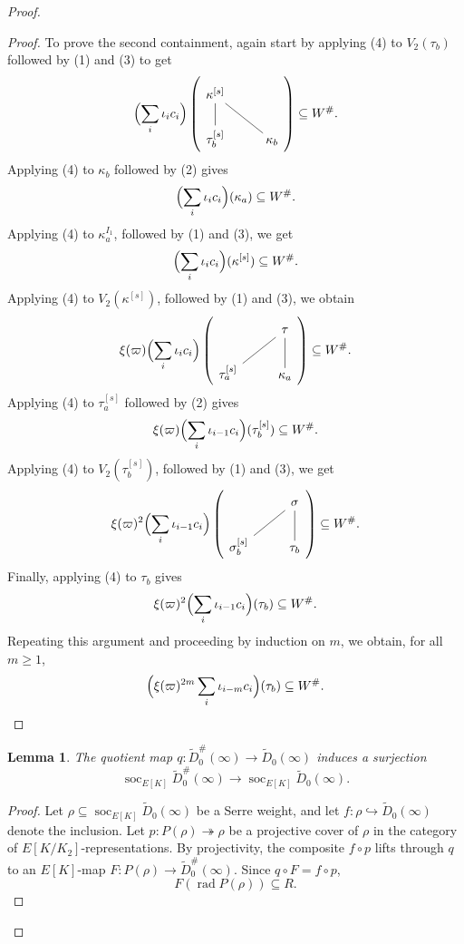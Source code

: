 \documentclass[a4paper,10pt,twoside]{amsart}
\newtheorem{lemma}[theorem]{Lemma}
\theoremstyle{definition}
\numberwithin{equation}{section}
\begin{document}
\begin{proof}
\begin{proof}
To prove the second containment, again start by applying (4) to $V_2(\tau_b)$ followed by (1) and (3) to get
\[
\Bigl( \sum_i \iota_i c_i \Bigr)
\left(
\begin{tikzcd}
\kappa^{[s]} & \\
\tau_b^{[s]} & \kappa_b
\arrow[no head, from=1-1, to=2-1]
\arrow[no head, from=1-1, to=2-2]
\end{tikzcd}
\right)
\subseteq W^\#.
\]
Applying (4) to $\kappa_b$ followed by (2) gives
\[
\Bigl( \sum_i \iota_i c_i \Bigr)(\kappa_a) \subseteq W^\#.
\]
Applying (4) to $\kappa_a^{I_1}$, followed by (1) and (3), we get
\[
\Bigl( \sum_i \iota_i c_i \Bigr)(\kappa^{[s]}) \subseteq W^\#.
\]
Applying (4) to $V_2(\kappa^{[s]})$, followed by (1) and (3), we obtain
\[
\xi(\varpi) \Bigl( \sum_i \iota_i c_i \Bigr)
\left(
\begin{tikzcd}
& \tau \\
\tau_a^{[s]} & \kappa_a
\arrow[no head, from=1-2, to=2-1]
\arrow[no head, from=1-2, to=2-2]
\end{tikzcd}
\right)
\subseteq W^\#.
\]
Applying (4) to $\tau_a^{[s]}$ followed by (2) gives
\[
\xi(\varpi) \Bigl( \sum_i \iota_{i-1} c_i \Bigr)(\tau_b^{[s]}) \subseteq W^\#.
\]
Applying (4) to $V_2(\tau_b^{[s]})$, followed by (1) and (3), we get
\[
\xi(\varpi)^2 \Bigl( \sum_i \iota_{i-1} c_i \Bigr)
\left(
\begin{tikzcd}
& \sigma \\
\sigma_b^{[s]} & \tau_b
\arrow[no head, from=1-2, to=2-1]
\arrow[no head, from=1-2, to=2-2]
\end{tikzcd}
\right)
\subseteq W^\#.
\]
Finally, applying (4) to $\tau_b$ gives
\[
\xi(\varpi)^2 \Bigl( \sum_i \iota_{i-1} c_i \Bigr)(\tau_b) \subseteq W^\#.
\]
Repeating this argument and proceeding by induction on $m$, we obtain, for all $m \ge 1$,
\[
\Bigl( \xi(\varpi)^{2m} \sum_i \iota_{i-m} c_i \Bigr)(\tau_b) \subseteq W^\#.
\]
\end{proof}

\begin{lemma}\label{socle surjection}
The quotient map
\(
q:\widetilde D_0^\#(\infty)\rightarrow
\widetilde D_0(\infty)
\)
induces a surjection $$\operatorname{soc}_{E[K]}\widetilde D_0^\#(\infty)
\rightarrow
\operatorname{soc}_{E[K]}\widetilde D_0(\infty).
$$ \end{lemma}

\begin{proof}

Let
\(
\rho\subseteq\operatorname{soc}_{E[K]}\widetilde D_0(\infty)
\)
be a Serre weight, and let $f:\rho\hookrightarrow\widetilde D_0(\infty)
$ denote the inclusion. Let
\(
p:P(\rho)\twoheadrightarrow\rho
\)
be a projective cover of $\rho$ in the category of
\(E[K/K_2]\)-representations. By projectivity, the composite
\(f\circ p\) lifts through \(q\) to an \(E[K]\)-map $F:P(\rho)\rightarrow\widetilde D_0^\#(\infty).
$ Since \(q\circ F=f\circ p\),
\begin{equation}\label{F(rad)in R}
F(\operatorname{rad}P(\rho))\subseteq R.
\end{equation}


\end{proof}
\end{proof}
\end{document}
